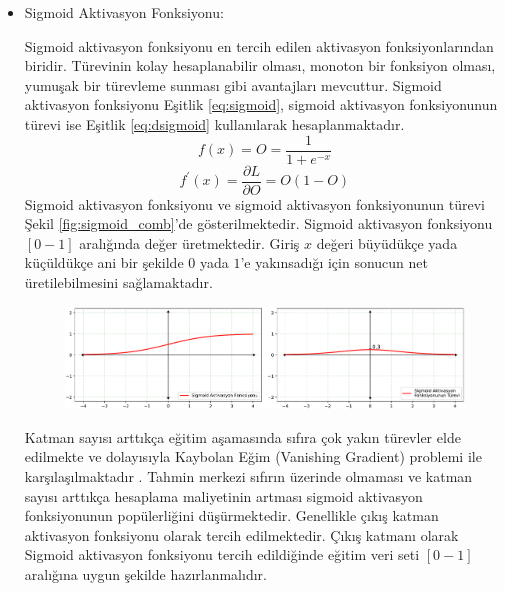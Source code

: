 \begin{itemize}
    \item Sigmoid Aktivasyon Fonksiyonu:
    
    Sigmoid aktivasyon fonksiyonu en tercih edilen aktivasyon fonksiyonlarından biridir. Türevinin kolay hesaplanabilir olması, monoton bir fonksiyon olması, yumuşak bir türevleme sunması gibi avantajları mevcuttur. Sigmoid aktivasyon fonksiyonu Eşitlik \ref{eq:sigmoid}, sigmoid aktivasyon fonksiyonunun türevi ise  Eşitlik \ref{eq:dsigmoid} kullanılarak hesaplanmaktadır.
    {\setlength{\mathindent}{0cm}
    \begin{equation}
    	\label{eq:sigmoid}
    	f(x)=O = \frac{1}{1+e^{-x}}
    \end{equation}
    \vspace{-1cm}
    \begin{equation}
    	\label{eq:dsigmoid}
    	f^{\prime}(x)= \frac{\partial L}{\partial  O}=O(1-O)
    \end{equation}}   
    Sigmoid aktivasyon fonksiyonu ve sigmoid aktivasyon fonksiyonunun türevi Şekil \ref{fig:sigmoid_comb}'de gösterilmektedir. Sigmoid aktivasyon fonksiyonu $[0 - 1]$ aralığında değer üretmektedir. Giriş $x$ değeri büyüdükçe yada küçüldükçe ani bir şekilde $0$ yada $1$'e yakınsadığı için sonucun net üretilebilmesini sağlamaktadır.
    
    \begin{figure}[h!]
    	\begin{center}
    		\vspace{0.4cm}
    		{
    			\vspace{0.4cm}
    			\includegraphics[scale=0.45]{Yapilan-Calismalar/Figures/sigmoid_comb.pdf}
    		}
    	\end{center}
    \end{figure}
    
    Katman sayısı arttıkça eğitim aşamasında sıfıra çok yakın türevler elde edilmekte ve dolayısıyla Kaybolan Eğim (Vanishing Gradient) problemi ile karşılaşılmaktadır \cite{hochreiter1998vanishing}. Tahmin merkezi sıfırın üzerinde olmaması ve katman sayısı arttıkça hesaplama maliyetinin artması sigmoid aktivasyon fonksiyonunun popülerliğini düşürmektedir. Genellikle çıkış katman aktivasyon fonksiyonu olarak tercih edilmektedir. Çıkış katmanı olarak Sigmoid aktivasyon fonksiyonu tercih edildiğinde eğitim veri seti $[0-1]$ aralığına uygun şekilde hazırlanmalıdır.
    

\end{itemize}
